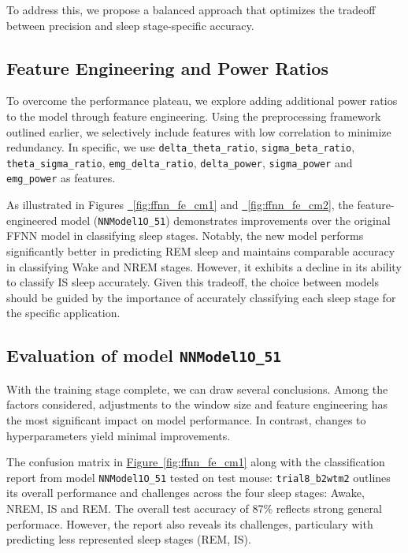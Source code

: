 \documentclass{article}
\begin{document}
\begin{multicols}{2}
To address this, we propose a balanced approach that optimizes the tradeoff between precision and sleep stage-specific accuracy.

\subsection*{Feature Engineering and Power Ratios}
To overcome the performance plateau, we explore adding additional power ratios to the model through feature engineering. Using the preprocessing framework outlined earlier, we selectively include features with low correlation to minimize redundancy. In specific, we use \texttt{delta\_theta\_ratio}, \texttt{sigma\_beta\_ratio}, \texttt{theta\_sigma\_ratio}, \texttt{emg\_delta\_ratio}, \texttt{delta\_power}, \texttt{sigma\_power} and \texttt{emg\_power} as features.

As illustrated in Figures \hyperref[fig:ffnn_fe_cm1]{~\ref*{fig:ffnn_fe_cm1}} and \hyperref[fig:ffnn_fe_cm2]{~\ref*{fig:ffnn_fe_cm2}}, the feature-engineered model (\texttt{NNModel1O\_51}) demonstrates improvements over the original FFNN model in classifying sleep stages. Notably, the new model performs significantly better in predicting REM sleep and maintains comparable accuracy in classifying Wake and NREM stages. However, it exhibits a decline in its ability to classify IS sleep accurately. Given this tradeoff, the choice between models should be guided by the importance of accurately classifying each sleep stage for the specific application.

\subsection*{Evaluation of model \texttt{NNModel1O\_51}}
With the training stage complete, we can draw several conclusions. Among the factors considered, adjustments to the window size and feature engineering has the most significant impact on model performance. In contrast, changes to hyperparameters yield minimal improvements.

The confusion matrix in \hyperref[fig:ffnn_fe_cm1]{Figure~\ref*{fig:ffnn_fe_cm1}} along with the classification report from model \texttt{NNModel1O\_51} tested on test mouse: \texttt{trial8\_b2wtm2} outlines its overall performance and challenges across the four sleep stages: Awake, NREM, IS and REM. The overall test accuracy of 87\% reflects strong general performace. However, the report also reveals its challenges, particulary with predicting less represented sleep stages (REM, IS).


\end{multicols}
\end{document}
